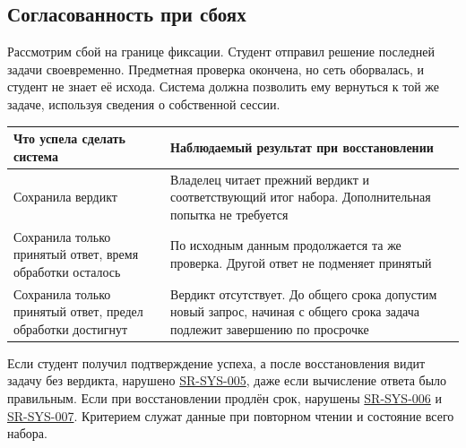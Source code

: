 \documentclass[12pt,a4paper]{article}
\newcounter{none} %
\begin{document}
\subsection{Согласованность при сбоях}\label{ux441ux43eux433ux43bux430ux441ux43eux432ux430ux43dux43dux43eux441ux442ux44c-ux43fux440ux438-ux441ux431ux43eux44fux445}

\hypertarget{согласованность-при-сбоях}{}

Рассмотрим сбой на границе фиксации. Студент отправил решение последней задачи своевременно. Предметная проверка окончена, но сеть оборвалась, и студент не знает её исхода. Система должна позволить ему вернуться к той же задаче, используя сведения о собственной сессии.

{\def\LTcaptype{none} %
\begin{longtable}[]{@{}
  >{\raggedright\arraybackslash}p{}
  >{\raggedright\arraybackslash}p{}@{}}
\toprule\noalign{}
\begin{minipage}[b]{\linewidth}\raggedright
Что успела сделать система
\end{minipage} & \begin{minipage}[b]{\linewidth}\raggedright
Наблюдаемый результат при восстановлении
\end{minipage} \\
\midrule\noalign{}
\endhead
\bottomrule\noalign{}
\endlastfoot
Сохранила вердикт & Владелец читает прежний вердикт и соответствующий итог набора. Дополнительная попытка не требуется \\
Сохранила только принятый ответ, время обработки осталось & По исходным данным продолжается та же проверка. Другой ответ не подменяет принятый \\
Сохранила только принятый ответ, предел обработки достигнут & Вердикт отсутствует. До общего срока допустим новый запрос, начиная с общего срока задача подлежит завершению по просрочке \\
\end{longtable}
}

Если студент получил подтверждение успеха, а после восстановления видит задачу без вердикта, нарушено {\hyperlink{sr-sys-005}{SR-SYS-005}}, даже если вычисление ответа было правильным. Если при восстановлении продлён срок, нарушены {\hyperlink{sr-sys-006}{SR-SYS-006}} и {\hyperlink{sr-sys-007}{SR-SYS-007}}. Критерием служат данные при повторном чтении и состояние всего набора.
\end{document}
